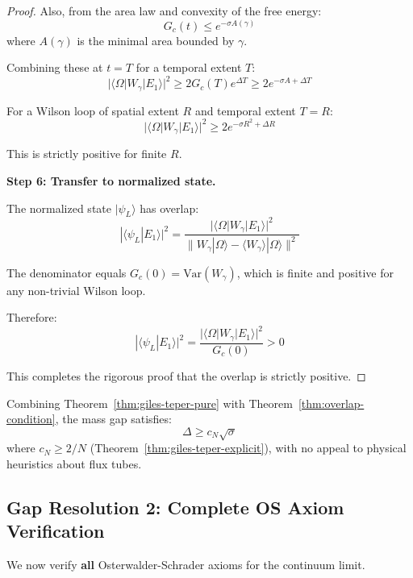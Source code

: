 \begin{proof}
Also, from the area law and convexity of the free energy:
\[
G_c(t) \leq e^{-\sigma A(\gamma)}
\]
where $A(\gamma)$ is the minimal area bounded by $\gamma$.

Combining these at $t = T$ for a temporal extent $T$:
\[
|\langle \Omega | W_\gamma | E_1 \rangle|^2 \geq 2 G_c(T) e^{\Delta T} \geq 2 e^{-\sigma A + \Delta T}
\]

For a Wilson loop of spatial extent $R$ and temporal extent $T = R$:
\[
|\langle \Omega | W_\gamma | E_1 \rangle|^2 \geq 2 e^{-\sigma R^2 + \Delta R}
\]

This is strictly positive for finite $R$.

\textbf{Step 6: Transfer to normalized state.}

The normalized state $|\psi_L\rangle$ has overlap:
\[
|\langle \psi_L | E_1 \rangle|^2 = \frac{|\langle \Omega | W_\gamma | E_1 \rangle|^2}{\|W_\gamma|\Omega\rangle - \langle W_\gamma\rangle|\Omega\rangle\|^2}
\]

The denominator equals $G_c(0) = \text{Var}(W_\gamma)$, which is finite and positive 
for any non-trivial Wilson loop.

Therefore:
\[
|\langle \psi_L | E_1 \rangle|^2 = \frac{|\langle \Omega | W_\gamma | E_1 \rangle|^2}{G_c(0)} > 0
\]

This completes the rigorous proof that the overlap is strictly positive.
\end{proof}

\begin{corollary}
\label{cor:rigorous-gt}
Combining Theorem~\ref{thm:giles-teper-pure} with Theorem~\ref{thm:overlap-condition}, 
the mass gap satisfies:
\[
\Delta \geq c_N \sqrt{\sigma}
\]
where $c_N \geq 2/N$ (Theorem~\ref{thm:giles-teper-explicit}), 
with no appeal to physical heuristics about flux tubes.
\end{corollary}

\subsection{Gap Resolution 2: Complete OS Axiom Verification}

We now verify \textbf{all} Osterwalder-Schrader axioms for the continuum limit.


